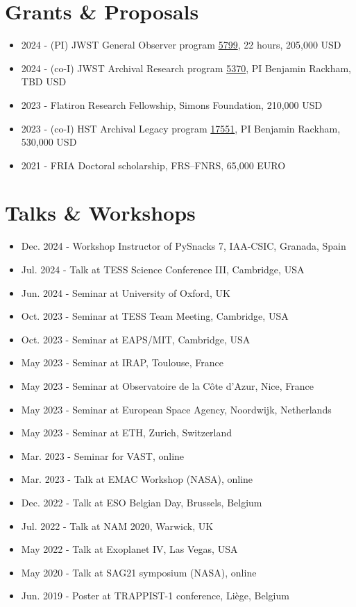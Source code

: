 \documentclass[10pt,letterpaper]{article}
\begin{document}
\section*{Grants \& Proposals}
\begin{itemize}
    \item 2024 - (PI) JWST General Observer program \href{https://www.stsci.edu/jwst/science-execution/program-information?id=5799}{5799}, 22 hours, 205,000 USD
    \item 2024 - (co-I) JWST Archival Research program \href{https://www.stsci.edu/jwst/science-execution/program-information?id=5370}{5370}, PI Benjamin Rackham, TBD USD
    \item 2023 - Flatiron Research Fellowship, Simons Foundation, 210,000 USD
    \item 2023 - (co-I) HST Archival Legacy program \href{https://www.stsci.edu/cgi-bin/get-proposal-info?id=17551&observatory=HST}{17551}, PI Benjamin Rackham, 530,000 USD
    \item 2021 - FRIA Doctoral scholarship, FRS–FNRS, 65,000 EURO
\end{itemize}
\section*{Talks \& Workshops}
\begin{itemize}
    \item Dec. 2024 - Workshop Instructor of PySnacks 7, IAA-CSIC, Granada, Spain
    \item Jul. 2024 - Talk at TESS Science Conference III, Cambridge, USA
    \item Jun. 2024 - Seminar at University of Oxford, UK
    \item Oct. 2023 - Seminar at TESS Team Meeting, Cambridge, USA
    \item Oct. 2023 - Seminar at EAPS/MIT, Cambridge, USA
    \item May 2023 - Seminar at IRAP, Toulouse, France
    \item May 2023 - Seminar at Observatoire de la Côte d'Azur, Nice, France
    \item May 2023 - Seminar at European Space Agency, Noordwijk, Netherlands
    \item May 2023 - Seminar at ETH, Zurich, Switzerland
    \item Mar. 2023 - Seminar for VAST, online
    \item Mar. 2023 - Talk at EMAC Workshop (NASA), online
    \item Dec. 2022 - Talk at ESO Belgian Day, Brussels, Belgium
    \item Jul. 2022 - Talk at NAM 2020, Warwick, UK
    \item May 2022 - Talk at Exoplanet IV, Las Vegas, USA
    \item May 2020 - Talk at SAG21 symposium (NASA), online
    \item Jun. 2019 - Poster at TRAPPIST-1 conference, Liège, Belgium
\end{itemize}
\end{document}

